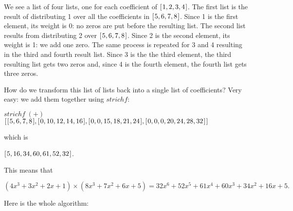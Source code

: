 \documentclass[tikz]{scrreprt}
\newcommand{\Varid}[1]{\mathit{#1}}
\begin{document}
We see a list of four lists, 
one for each coefficient of \ensuremath{[\mskip1.5mu \mathrm{1},\mathrm{2},\mathrm{3},\mathrm{4}\mskip1.5mu]}.
The first list is the result of distributing 1 
over all the coefficients in \ensuremath{[\mskip1.5mu \mathrm{5},\mathrm{6},\mathrm{7},\mathrm{8}\mskip1.5mu]}.
Since 1 is the first element,
its weight is 0: no zeros are put before the resulting list.
The second list results from distributing 2 over \ensuremath{[\mskip1.5mu \mathrm{5},\mathrm{6},\mathrm{7},\mathrm{8}\mskip1.5mu]}.
Since 2 is the second element, its weight is 1:
we add one zero.
The same process is repeated for 3 and 4 resulting
in the third and fourth result list.
Since 3 is the the third element, the third resulting list
gets two zeros and, since 4 is the fourth element,
the fourth list gets three zeros.

How do we transform this list of lists back
into a single list of coefficients? Very easy:
we add them together using \ensuremath{\Varid{strichf}}:

\ensuremath{\Varid{strichf}\;(\mathbin{+})}
\ensuremath{[\mskip1.5mu [\mskip1.5mu \mathrm{5},\mathrm{6},\mathrm{7},\mathrm{8}\mskip1.5mu],[\mskip1.5mu \mathrm{0},\mathrm{10},\mathrm{12},\mathrm{14},\mathrm{16}\mskip1.5mu],[\mskip1.5mu \mathrm{0},\mathrm{0},\mathrm{15},\mathrm{18},\mathrm{21},\mathrm{24}\mskip1.5mu],[\mskip1.5mu \mathrm{0},\mathrm{0},\mathrm{0},\mathrm{20},\mathrm{24},\mathrm{28},\mathrm{32}\mskip1.5mu]\mskip1.5mu]}

which is

\ensuremath{[\mskip1.5mu \mathrm{5},\mathrm{16},\mathrm{34},\mathrm{60},\mathrm{61},\mathrm{52},\mathrm{32}\mskip1.5mu]}.

This means that

\begin{equation}
(4x^3 + 3x^2 + 2x + 1) \times (8x^3 + 7x^2 + 6x + 5) =
32x^6 + 52x^5 + 61x^4 + 60x^3 + 34x^2 + 16x + 5.
\end{equation}

Here is the whole algorithm:
\end{document}
